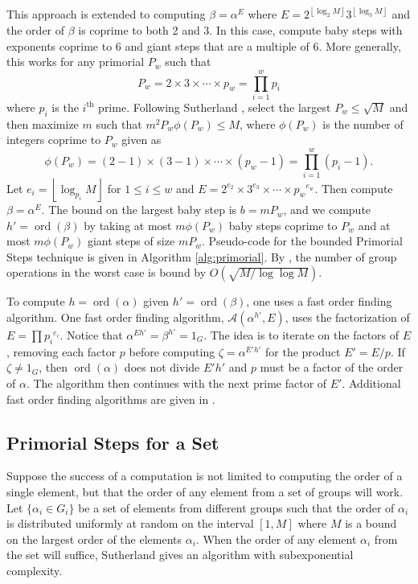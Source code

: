 \documentclass{ucalgthes1}
\theoremstyle{definition}
\DeclareMathOperator{\ord}{ord}
\newcommand{\floor}[1]{\left\lfloor #1 \right\rfloor}
\begin{document}
This approach is extended to computing $\beta = \alpha^E$ where $E = 2^{\floor{\log_2 M}} 3^{\floor{\log_3 M}}$ and the order of $\beta$ is coprime to both 2 and 3.  In this case, compute baby steps with exponents coprime to 6 and giant steps that are a multiple of 6.  More generally, this works for any primorial $P_w$ such that
\[
	P_w = 2 \times 3 \times \cdots \times p_w = \prod_{i=1}^w p_i
\]
where $p_i$ is the $i^{\textrm{th}}$ prime.  Following Sutherland \cite[p.57]{Sutherland2007}, select the largest $P_w \le \sqrt{M}$ and then maximize $m$ such that $m^2P_w \phi(P_w) \le M$, where $\phi(P_w)$ is the number of integers coprime to $P_w$ given as
\begin{equation}
\label{eq:phiPrimorial}
	\phi(P_w) = (2-1) \times (3-1) \times \cdots \times (p_w - 1) = \prod_{i=1}^w (p_i - 1).
\end{equation}
Let $e_i = \floor{\log_{p_i} M}$ for $1 \le i \le w$ and $E = 2^{e_2} \times 3^{e_3} \times \cdots \times {p_w}^{e_w}$.  Then compute $\beta = \alpha^E$.  The bound on the largest baby step is $b = m P_w$, and we compute $h' = \ord(\beta)$ by taking at most $m \phi(P_w)$ baby steps coprime to $P_w$ and at most $m \phi(P_w)$ giant steps of size $m P_w$.  Pseudo-code for the bounded Primorial Steps technique is given in Algorithm \ref{alg:primorial}.  By \cite[p.59~Proposition~4.2]{Sutherland2007}, the number of group operations in the worst case is bound by $O(\sqrt{M / \log \log M})$.

To compute $h = \ord(\alpha)$ given $h' = \ord(\beta)$, one uses a fast order finding algorithm.  One fast order finding algorithm, $\mathcal A(\alpha^{h'}, E)$, uses the factorization of $E=\prod {p_i}^{e_i}$.  Notice that $\alpha^{Eh'} = \beta^{h'} = 1_G$.  The idea is to iterate on the factors of $E$, removing each factor $p$ before computing $\zeta = \alpha^{E'h'}$ for the product $E' = E/p$. If $\zeta \neq 1_G$, then $\ord(\alpha)$ does not divide $E'h'$ and $p$ must be a factor of the order of $\alpha$.  The algorithm then continues with the next prime factor of $E'$.  Additional fast order finding algorithms are given in \mbox{\cite[Chapter~7]{Sutherland2007}}.

\subsection{Primorial Steps for a Set}

Suppose the success of a computation is not limited to computing the order of a single element, but that the order of any element from a set of groups will work.  Let $\{ \alpha_i \in G_i \}$ be a set of elements from different groups such that the order of $\alpha_i$ is distributed uniformly at random on the interval $[1, M]$ where $M$ is a bound on the largest order of the elements $\alpha_i$.  When the order of any element $\alpha_i$ from the set will suffice, Sutherland \cite[\S 5.4]{Sutherland2007} gives an algorithm with subexponential complexity.
\end{document}
